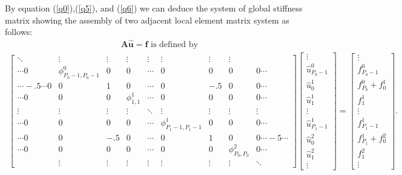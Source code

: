 By equation (\ref{q0}),(\ref{q5}), and (\ref{q6}) we can deduce
the system of global stiffness matrix showing the assembly of two
adjacent local element matrix system as follows:
\begin{eqnarray}
\label{localsystem}
&{\mathbf A \mathbf{\hat u} = \mathbf f} \mbox{ is defined by }
\end{eqnarray}
\begin{eqnarray*}
\begin{bmatrix}
    \ddots &\vdots  &\vdots &\vdots &\vdots &\vdots &\vdots &\vdots & \\
    \cdots0 &\phi_{P_0-1,P_0-1}^0   & 0     & 0     &\cdots & 0     & 0     & 0     &0\cdots    \\
    \cdots-.5\cdots0 & 0    & 1     & 0     &\cdots & 0     & -.5   & 0     &0\cdots \\
    \cdots0 & 0      & 0    &\phi_{1,1}^1   &\cdots & 0     & 0     & 0     &0\cdots \\
    \vdots &\vdots  &\vdots &\vdots &\ddots &\vdots &\vdots &\vdots &\vdots  \\
    \cdots0 & 0      & 0    & 0    &\cdots  &\phi_{P_1-1,P_1-1}^1   & 0     & 0   &0\cdots \\
    \cdots0 & 0      & -.5  & 0    &\cdots  & 0     &1      & 0     & 0\cdots-5\cdots \\
    \cdots0 & 0      & 0    & 0    &\cdots  & 0     &0      &\phi_{P_0,P_0}^2   & 0\cdots \\
           &\vdots  &\vdots &\vdots &\vdots &\vdots &\vdots &\vdots &\ddots
\end{bmatrix}
\begin{bmatrix}
    \vdots      \\
    {\hat u_{P_0-1}^0}  \\
    {\hat u_0^1}\\%
    {\hat u_1^1}\\
    \vdots      \\
    {\hat u_{P_1-1}^1}  \\
    {\hat u_0^2}\\%
    {\hat u_1^2}\\
    \vdots
\end{bmatrix}
=
\begin{bmatrix}
    \vdots      \\
    f_{P_0-1}^0 \\
    f_{P_0}^0 + f_{0}^1 \\
    f_{1}^1 \\
    \vdots  \\
    f_{P_1-1}^1 \\
    f_{P_1}^1 + f_{0}^2 \\
    f_{1}^2 \\
    \vdots
\end{bmatrix}.
\end{eqnarray*}

